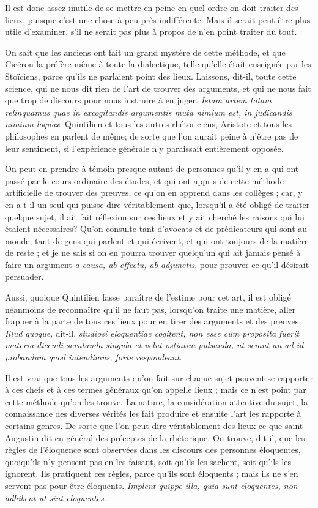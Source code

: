 Il est donc assez inutile de se mettre en peine en quel ordre on doit traiter des lieux, puisque c'est une chose à peu près indifférente. Mais il serait peut-être plus utile d'examiner, s'il ne serait pas plus à propos de n'en point traiter du tout.

On sait que les anciens ont fait un grand mystère de cette méthode, et que Cicéron la préfère même à toute la dialectique, telle qu'elle était enseignée par les Stoïciens, parce qu'ils ne parlaient point des lieux. Laissons, dit-il, toute cette science, qui ne nous dit rien de l'art de trouver des arguments, et qui ne nous fait que trop de discours pour nous instruire à en juger. \emph{Istam artem totam relinquamus quae in excogitandis argumentis muta nimium est, in judicandis nimium loquax}. Quintilien et tous les autres rhétoriciens, Aristote et tous les philosophes en parlent de même; de sorte que l'on aurait peine à n'être pas de leur sentiment, si l'expérience générale n'y paraissait entièrement opposée.

On peut en prendre à témoin presque autant de personnes qu'il y en a qui ont passé par le cours ordinaire des études, et qui ont appris de cette méthode artificielle de trouver des preuves, ce qu'on en apprend dans les collèges ; car, y en a-t-il un seul qui puisse dire véritablement que, lorsqu'il a été obligé de traiter quelque sujet, il ait fait réflexion sur ces lieux et y ait cherché les raisons qui lui étaient nécessaires? Qu'on consulte tant d'avocats et de prédicateurs qui sont au monde, tant de gens qui parlent et qui écrivent, et qui ont toujours de la matière de reste ; et je ne sais si on en pourra trouver quelqu'un qui ait jamais pensé à faire un argument \emph{a causa, ab effectu, ab adjunctis}, pour prouver ce qu'il désirait persuader.

Aussi, quoique Quintilien fasse paraître de l'estime pour cet art, il est obligé néanmoins de reconnaître qu'il ne faut pas, lorsqu'on traite une matière, aller frapper à la parte de tous ces lieux pour en tirer des arguments et des preuves, \emph{Illud quoque}, dit-il, \emph{studiosi eloquentiae cogitent, non esse cum proposita fuerit materia dicendi scrutanda singula et velut ostiatim pulsanda, ut sciant an ad id probandum quod intendimus, forte respondeant}.


Il est vrai que tous les arguments qu'on fait sur chaque sujet peuvent se rapporter à ces chefs et à ces termes généraux qu'on appelle lieux ; mais ce n'est point par cette méthode qu'on les trouve. La nature, la considération attentive du sujet, la connaissance des diverses vérités les fait produire et ensuite l'art les rapporte à certains genres. De sorte que l'on peut dire véritablement des lieux ce que saint Augustin dit en général des préceptes de la rhétorique. On trouve, dit-il, que les règles de l'éloquence sont observées dans les discours des personnes éloquentes, quoiqu'ils n'y pensent pas en les faisant, soit qu'ils les sachent, soit qu'ils les ignorent. Ils pratiquent ces règles, parce qu'ils sont éloquents ; mais ils ne s'en servent pas pour être éloquents. \emph{Implent quippe illa, quia sunt eloquentes, non adhibent ut sint eloquentes}.

